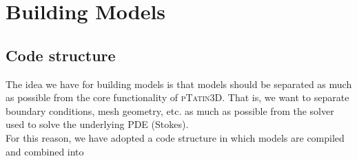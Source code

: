 \documentclass[paper=a4, fontsize=11pt,twoside]{scrartcl}
\newcommand{\ptat}{{{\textsc{pTatin3D}}}}
\begin{document}
\newpage
\section{Building Models}

\subsection{Code structure}
The idea we have for building models is that models should be separated as much as possible
from the core functionality of {\ptat}. That is, we want to separate boundary conditions,
mesh geometry, etc. as much as possible from the solver used to solve the underlying PDE (Stokes).
\\[8pt]
For this reason, we have adopted a code structure in which models are compiled and combined into
\end{document}

